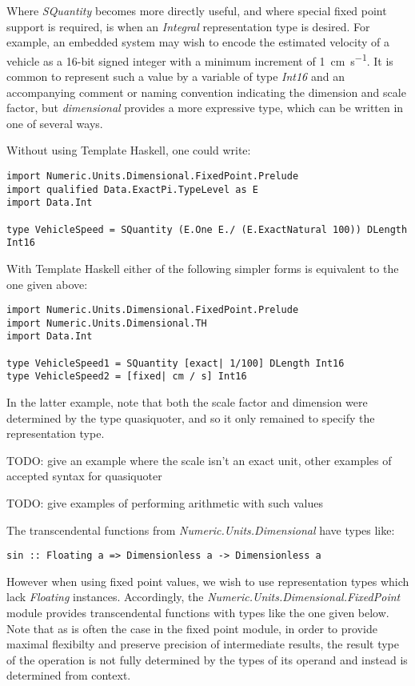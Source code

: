 \documentclass[12pt]{report}
\newcommand{\packagename}[1]{\textit{#1}}
\newcommand{\thispackage}{\packagename{dimensional}}
\newcommand{\classname}[1]{\textit{#1}}
\newcommand{\typename}[1]{\textit{#1}}
\newcommand{\modulename}[1]{\textit{#1}}
\begin{document}
Where \typename{SQuantity} becomes more directly useful, and where special fixed point support is required, is when an
\classname{Integral} representation type is desired. For example, an embedded system may wish to encode the estimated
velocity of a vehicle as a 16-bit signed integer with a minimum increment of \SI{1}{\centi\meter\per\second}. It is common
to represent such a value by a variable of type \typename{Int16} and an accompanying comment or naming convention indicating
the dimension and scale factor, but \thispackage{} provides a more expressive type, which can be written in one of several ways.

Without using Template Haskell, one could write:

\begin{lstlisting}
import Numeric.Units.Dimensional.FixedPoint.Prelude
import qualified Data.ExactPi.TypeLevel as E
import Data.Int

type VehicleSpeed = SQuantity (E.One E./ (E.ExactNatural 100)) DLength Int16
\end{lstlisting}

With Template Haskell either of the following simpler forms is equivalent to the one given above:

\begin{lstlisting}
import Numeric.Units.Dimensional.FixedPoint.Prelude
import Numeric.Units.Dimensional.TH
import Data.Int

type VehicleSpeed1 = SQuantity [exact| 1/100] DLength Int16
type VehicleSpeed2 = [fixed| cm / s] Int16
\end{lstlisting}

In the latter example, note that both the scale factor and dimension were determined by the type quasiquoter, and so it
only remained to specify the representation type.

TODO: give an example where the scale isn't an exact unit, other examples of accepted syntax for quasiquoter

TODO: give examples of performing arithmetic with such values

The transcendental functions from \modulename{Numeric.Units.Dimensional} have types like:

\begin{lstlisting}
sin :: Floating a => Dimensionless a -> Dimensionless a
\end{lstlisting}

However when using fixed point values, we wish to use representation types which lack \classname{Floating} instances. Accordingly,
the \modulename{Numeric.Units.Dimensional.FixedPoint} module provides transcendental functions with types like the one given below.
Note that as is often the case in the fixed point module, in order to provide maximal flexibilty and preserve precision of
intermediate results, the result type of the operation is not fully determined by the types of its operand and instead is
determined from context.
\end{document}
